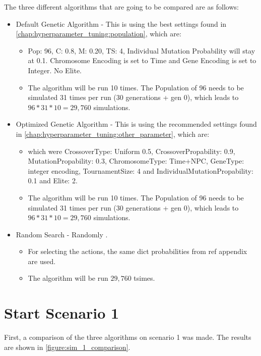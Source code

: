 The three different algorithms that are going to be compared are as follows:
\begin{itemize}
	\item Default Genetic Algorithm - This is using the best settings found in \ref{chap:hyperparameter_tuning:population}, which are:
	\begin{itemize}
		\item Pop: 96, C: 0.8, M: 0.20, TS: 4, Individual Mutation Probability will stay at 0.1. Chromosome Encoding is set to Time and Gene Encoding is set to Integer. No Elite. 
		\item The algorithm will be run 10 times. The Population of 96 needs to be simulated 31 times per run (30 generations + gen 0), which leads to $96 * 31 * 10 = 29,760$ simulations.
	\end{itemize}
	\item Optimized Genetic Algorithm - This is using the recommended settings found in \ref{chap:hyperparameter_tuning:other_parameter}, which are:
	\begin{itemize}
		\item 	which were CrossoverType: Uniform 0.5, CrossoverPropability: 0.9, MutationPropability: 0.3, ChromosomeType: Time+NPC, GeneType: integer encoding, TournamentSize: 4 and IndividualMutationPropability: 0.1 and Elite: 2. 
		\item The algorithm will be run 10 times. The Population of 96 needs to be simulated 31 times per run (30 generations + gen 0), which leads to $96 * 31 * 10 = 29,760$ simulations.
	\end{itemize}
	\item Random Search - Randomly .
	\begin{itemize}
		\item For selecting the actions, the same dict probabilities from ref appendix are used. 
		\item The algorithm will be run $29,760$ tsimes.
	\end{itemize}
\end{itemize}

\section{Start Scenario 1}
First, a comparison of the three algorithms on scenario 1 was made. The results are shown in \ref{figure:sim_1_comparison}.

